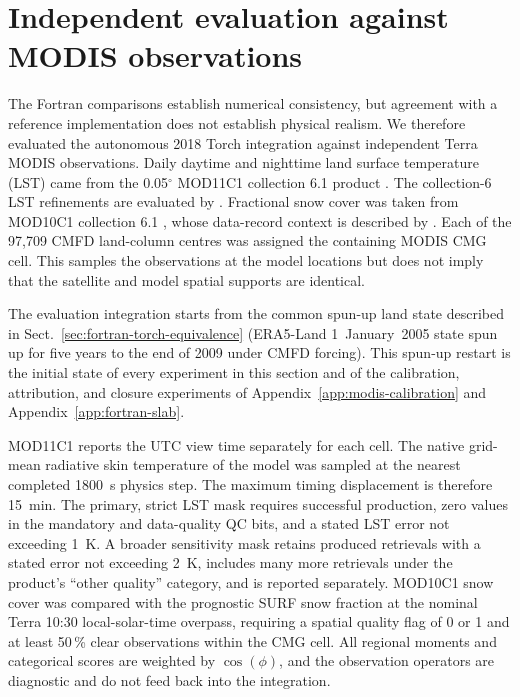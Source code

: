 \section{Independent evaluation against MODIS observations}
\label{sec:modis-evaluation}

The Fortran comparisons establish numerical consistency, but agreement with a
reference implementation does not establish physical realism. We therefore
evaluated the autonomous 2018 Torch integration against independent Terra
MODIS observations. Daily daytime and nighttime land surface temperature
(LST) came from the 0.05$^\circ$ MOD11C1 collection 6.1 product
\citep{Wan2021MOD11C1}. The collection-6 LST refinements are evaluated by
\citet{Wan2014MODISLST}. Fractional snow cover was taken from MOD10C1
collection 6.1 \citep{Hall2021MOD10C1}, whose data-record context is described
by \citet{Riggs2017MODISSnow}. Each of the 97,709 CMFD
land-column centres was assigned the containing MODIS CMG cell. This samples
the observations at the model locations but does not imply that the
satellite and model spatial supports are identical.

The evaluation integration starts from the common spun-up land state
described in Sect.~\ref{sec:fortran-torch-equivalence} (ERA5-Land 1~January~2005
state spun up for five years to the end of 2009 under CMFD forcing). This
spun-up restart is the initial state of every experiment in this section and
of the calibration, attribution, and closure experiments of
Appendix~\ref{app:modis-calibration} and Appendix~\ref{app:fortran-slab}.

MOD11C1 reports the UTC view time separately for each cell. The native
grid-mean radiative skin temperature of the model was sampled at the nearest
completed 1800~s physics step. The maximum timing displacement is therefore
15~min. The primary, strict LST mask requires successful production, zero
values in the mandatory and data-quality QC bits, and a stated LST error not
exceeding 1~K. A broader sensitivity mask retains produced retrievals with a
stated error not exceeding 2~K, includes many more retrievals under the
product's ``other quality'' category, and is reported separately.
MOD10C1 snow cover was compared with the prognostic SURF snow fraction at the
nominal Terra 10:30 local-solar-time overpass, requiring a spatial quality
flag of 0 or 1 and at least 50\,\% clear observations within the CMG cell.
All regional moments and categorical scores are weighted by
$\cos(\phi)$, and the observation operators are diagnostic and do not feed
back into the integration.

